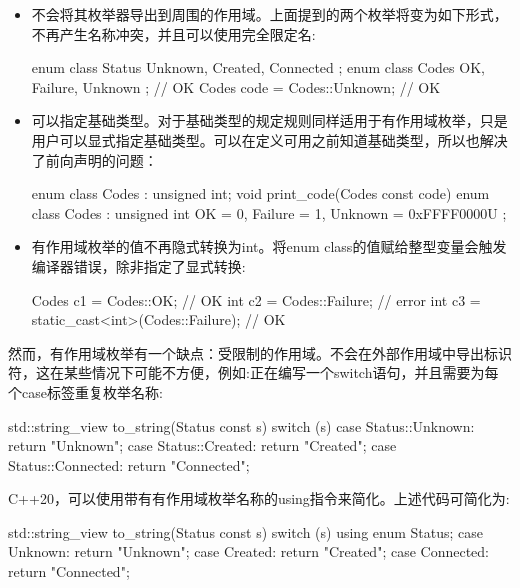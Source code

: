 \begin{itemize}
\item
不会将其枚举器导出到周围的作用域。上面提到的两个枚举将变为如下形式，不再产生名称冲突，并且可以使用完全限定名:

\begin{cpp}
enum class Status { Unknown, Created, Connected };
enum class Codes { OK, Failure, Unknown }; // OK
Codes code = Codes::Unknown;               // OK
\end{cpp}

\item
可以指定基础类型。对于基础类型的规定规则同样适用于有作用域枚举，只是用户可以显式指定基础类型。可以在定义可用之前知道基础类型，所以也解决了前向声明的问题：

\begin{cpp}
enum class Codes : unsigned int;
void print_code(Codes const code) {}
enum class Codes : unsigned int
{
    OK = 0,
    Failure = 1,
    Unknown = 0xFFFF0000U
};
\end{cpp}

\item
有作用域枚举的值不再隐式转换为int。将enum class的值赋给整型变量会触发编译器错误，除非指定了显式转换:

\begin{cpp}
Codes c1 = Codes::OK;                       // OK
int c2 = Codes::Failure;                    // error
int c3 = static_cast<int>(Codes::Failure);  // OK
\end{cpp}

\end{itemize}

然而，有作用域枚举有一个缺点：受限制的作用域。不会在外部作用域中导出标识符，这在某些情况下可能不方便，例如:正在编写一个switch语句，并且需要为每个case标签重复枚举名称:

\begin{cpp}
std::string_view to_string(Status const s)
{
    switch (s)
    {
        case Status::Unknown:   return "Unknown";
        case Status::Created:   return "Created";
        case Status::Connected: return "Connected";
    }
}
\end{cpp}

C++20，可以使用带有有作用域枚举名称的using指令来简化。上述代码可简化为:

\begin{cpp}
std::string_view to_string(Status const s)
{
    switch (s)
    {
        using enum Status;
        case Unknown:   return "Unknown";
        case Created:   return "Created";
        case Connected: return "Connected";
    }
}
\end{cpp}

